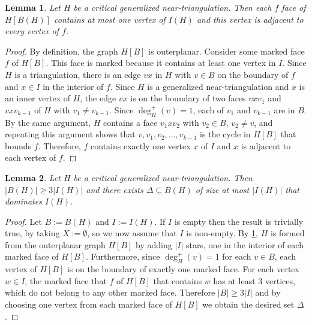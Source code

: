 \documentclass[12pt]{article}
\newtheorem{lem}{Lemma}
\theoremstyle{definition}
\begin{document}
\begin{lem}\label{critical_structure}
    Let $H$ be a critical generalized near-triangulation. Then each $f$ face of $H[B(H)]$ contains at most one vertex of $I(H)$ and this vertex is adjacent to every vertex of $f$.
\end{lem}

\begin{proof}
  By definition, the graph $H[B]$ is outerplanar.  Consider some marked face $f$ of $H[B]$.  This face is marked because it contains at least one vertex in $I$.  Since $H$ is a triangulation, there is an edge $vx$ in $H$ with $v\in B$ on the boundary of $f$ and $x\in I$ in the interior of $f$. Since $H$ is a generalized near-triangulation and $x$ is an inner vertex of $H$, the edge $vx$ is on the boundary of two faces $vxv_1$ and $vxv_{k-1}$ of $H$ with $v_1\neq v_{k-1}$.  Since $\deg^+_H(v)=1$, each of $v_1$ and $v_{k-1}$ are in $B$.  By the same argument, $H$ contains a face $v_1xv_2$ with $v_2\in B$, $v_2\neq v$, and repeating this argument shows that $v,v_1,v_2,\ldots,v_{k-1}$ is the cycle in $H[B]$ that bounds $f$.  Therefore, $f$ contains exactly one vertex $x$ of $I$ and $x$ is adjacent to each vertex of $f$.
\end{proof}

\begin{lem}\label{base_case}
    Let $H$ be a critical generalized near-triangulation. Then $|B(H)|\ge 3|I(H)|$ and there exists $\Delta\subseteq B(H)$ of size at most $|I(H)|$ that dominates $I(H)$.
\end{lem}

\begin{proof}
  Let $B:=B(H)$ and $I:=I(H)$.  If $I$ is empty then the result is trivially true, by taking $X:=\emptyset$, so we now assume that $I$ is non-empty.  By \cref{critical_structure}, $H$ is formed from the outerplanar graph $H[B]$ by adding $|I|$ stars, one in the interior of each marked face of $H[B]$.  Furthermore, since $\deg_H^+(v)=1$ for each $v\in B$, each vertex of $H[B]$ is on the boundary of exactly one marked face.  For each vertex $w\in I$, the marked face that $f$ of $H[B]$ that contains $w$ has at least $3$ vertices, which do not belong to any other marked face. Therefore $|B|\ge 3|I|$ and by choosing one vertex from each marked face of $H[B]$ we obtain the desired set $\Delta$.
\end{proof}
\end{document}
